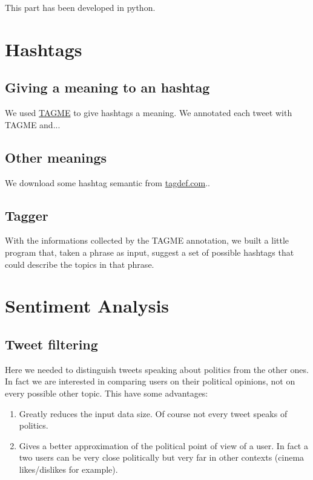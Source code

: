 \documentclass[a4paper,11pt,oneside]{article}
\begin{document}
This part has been developed in python.

\section{Hashtags}

\subsection{Giving a meaning to an hashtag}
We used \href{http://tagme.di.unipi.it/}{TAGME} to give hashtags a meaning. We annotated each tweet with TAGME and...

\subsection{Other meanings}
We download some hashtag semantic from \href{http://tagdef.com/}{tagdef.com}..

\subsection{Tagger}
With the informations collected by the TAGME annotation, we built a little program that, taken a phrase as input, suggest a set of possible hashtags that could describe the topics in that phrase.

\section{Sentiment Analysis}
\subsection{Tweet filtering}
Here we needed to distinguish tweets speaking about politics from the other ones. In fact we are interested in comparing users on their political opinions, not on every possible other topic. This have some advantages:
\begin{enumerate}
\item Greatly reduces the input data size. Of course not every tweet speaks of politics.
\item Gives a better approximation of the political point of view of a user. In fact a two users can be very close politically but very far in other contexts (cinema likes/dislikes for example).
\end{enumerate}
\end{document}

